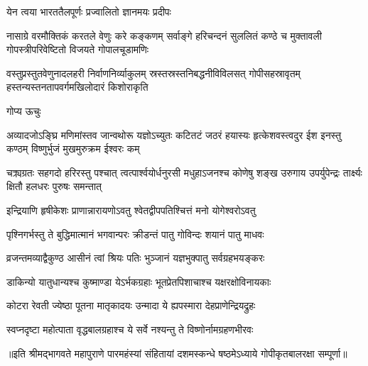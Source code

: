 

{येन त्वया भारततैलपूर्णः प्रज्वालितो ज्ञानमयः प्रदीपः}

{नासाग्रे वरमौक्तिकं करतले वेणुः करे कङ्कणम्}
{सर्वाङ्गे हरिचन्दनं सुललितं कण्ठे च मुक्तावली}
{गोपस्त्रीपरिवेष्टितो विजयते गोपालचूडामणिः}

{वस्तुप्रस्तुतवेणुनादलहरी निर्वाणनिर्व्याकुलम्}
{स्रस्तस्रस्तनिबद्धनीविविलसत् गोपीसहस्रावृतम्}
{हस्तन्यस्तनतापवर्गमखिलोदारं किशोराकृति}

गोप्य ऊचुः

\fourlineindentedshloka
{अव्यादजोऽङ्घ्रि मणिमांस्तव जान्वथोरू}
{यज्ञोऽच्युतः कटितटं जठरं हयास्यः}
{हृत्केशवस्त्वदुर ईश इनस्तु कण्ठम्}
{विष्णुर्भुजं मुखमुरुक्रम ईश्वरः कम्}

\fourlineindentedshloka
{चक्र्यग्रतः सहगदो हरिरस्तु पश्चात्}
{त्वत्पार्श्वयोर्धनुरसी मधुहाऽजनश्च}
{कोणेषु शङ्ख उरुगाय उपर्युपेन्द्रः}
{तार्क्ष्यः क्षितौ हलधरः पुरुषः समन्तात्}

\twolineshloka
{इन्द्रियाणि हृषीकेशः प्राणान्नारायणोऽवतु}
{श्वेतद्वीपपतिश्चित्तं मनो योगेश्वरोऽवतु}

\twolineshloka
{पृश्निगर्भस्तु ते बुद्धिमात्मानं भगवान्परः}
{क्रीडन्तं पातु गोविन्दः शयानं पातु माधवः}

\twolineshloka
{व्रजन्तमव्याद्वैकुण्ठ आसीनं त्वां श्रियः पतिः}
{भुञ्जानं यज्ञभुक्पातु सर्वग्रहभयङ्करः}

\twolineshloka
{डाकिन्यो यातुधान्यश्च कुष्माण्डा येऽर्भकग्रहाः}
{भूतप्रेतपिशाचाश्च यक्षरक्षोविनायकाः}

\twolineshloka
{कोटरा रेवती ज्येष्ठा पूतना मातृकादयः}
{उन्मादा ये ह्यपस्मारा देहप्राणेन्द्रियद्रुहः}

\twolineshloka
{स्वप्नदृष्टा महोत्पाता वृद्धबालग्रहाश्च ये}
{सर्वे नश्यन्तु ते विष्णोर्नामग्रहणभीरवः}

{॥इति श्रीमद्भागवते महापुराणे पारमहंस्यां संहितायां दशमस्कन्धे षष्ठमेऽध्याये गोपीकृतबालरक्षा सम्पूर्णा॥}